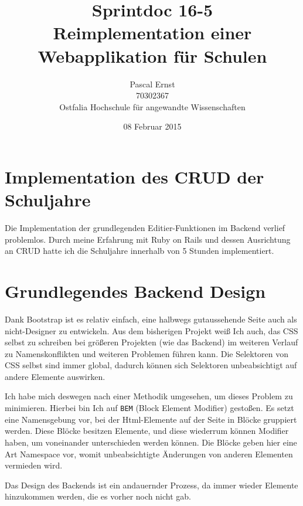\documentclass[a4paper,10pt]{scrartcl}
\begin{document}
\title{Sprintdoc 16-5 \\
  Reimplementation einer Webapplikation für Schulen}
\author{Pascal Ernst\\
  70302367 \\
  Ostfalia Hochschule für angewandte Wissenschaften}
\date{08 Februar 2015}
\maketitle

\newpage

\section{Implementation des CRUD der Schuljahre}

  Die Implementation der grundlegenden Editier-Funktionen im Backend verlief
  problemlos.
  Durch meine Erfahrung mit Ruby on Rails und dessen Ausrichtung an CRUD
  hatte ich die Schuljahre innerhalb von 5 Stunden implementiert.

\section{Grundlegendes Backend Design}

  Dank Bootstrap ist es relativ einfach, eine halbwegs gutaussehende Seite auch
  als nicht-Designer zu entwickeln.
  Aus dem bisherigen Projekt weiß Ich auch, das CSS selbst zu schreiben bei
  größeren Projekten (wie das Backend) im weiteren Verlauf zu Namenskonflikten
  und weiteren Problemen führen kann.
  Die Selektoren von CSS selbst sind immer global, dadurch können sich
  Selektoren unbeabsichtigt auf andere Elemente auswirken.

  Ich habe mich deswegen nach einer Methodik umgesehen, um dieses Problem zu
  minimieren.
  Hierbei bin Ich auf \lstinline{BEM} (Block Element Modifier) gestoßen.
  Es setzt eine Namensgebung vor, bei der Html-Elemente auf der Seite in
  Blöcke gruppiert werden.
  Diese Blöcke besitzen Elemente, und diese wiederrum können Modifier haben,
  um voneinander unterschieden werden können.
  Die Blöcke geben hier eine Art Namespace vor, womit unbeabsichtigte Änderungen
  von anderen Elementen vermieden wird.

  Das Design des Backends ist ein andauernder Prozess, da immer wieder Elemente
  hinzukommen werden, die es vorher noch nicht gab.
\end{document}
